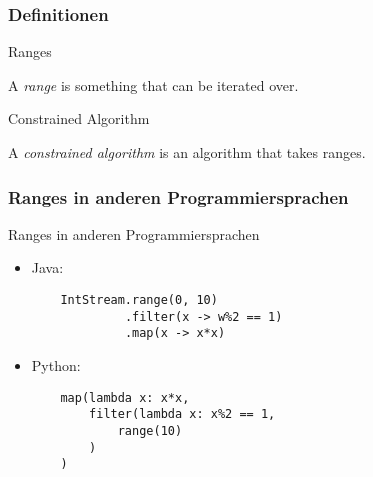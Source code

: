 \subsubsection*{Definitionen}

\begin{frame}{Ranges}
    \begin{center}
        A \emph{range} is something that can be iterated over.
    \end{center}
\end{frame}

\begin{frame}{Constrained Algorithm}
    \begin{center}
        A \emph{constrained algorithm} is an algorithm that takes ranges.
    \end{center}
\end{frame}

\subsubsection*{Ranges in anderen Programmiersprachen}

\begin{frame}[fragile]{Ranges in anderen Programmiersprachen}
    \begin{itemize}
        \item<1->
            Java:
            \begin{verbatim}
    IntStream.range(0, 10)
             .filter(x -> w%2 == 1)
             .map(x -> x*x)
        \end{verbatim}
        \item<2->
            Python:
            \begin{verbatim}
    map(lambda x: x*x,
        filter(lambda x: x%2 == 1,
            range(10)
        )
    )
        \end{verbatim}
    \end{itemize}
\end{frame}